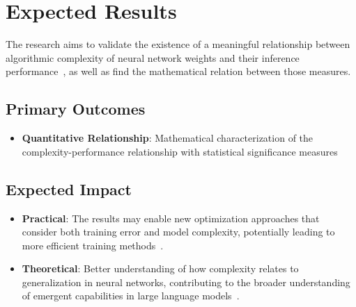 \section{Expected Results}

    The research aims to validate the existence of a meaningful relationship between algorithmic complexity of neural network weights and their inference performance~\cite{murta2025complexity}, as well as find the mathematical relation between those measures.

    \subsection{Primary Outcomes}

        \begin{itemize}
            \item \textbf{Quantitative Relationship}: Mathematical characterization of the complexity-performance relationship with statistical significance measures
        \end{itemize}

    \subsection{Expected Impact}

        \begin{itemize}
            \item \textbf{Practical}: 
            The results may enable new optimization approaches that consider both training error and model complexity, potentially leading to more efficient training methods~\cite{chollet2019measure}.

            \item \textbf{Theoretical}: 
            Better understanding of how complexity relates to generalization in neural networks, contributing to the broader understanding of emergent capabilities in large language models~\cite{wei2022emergent}.
        \end{itemize}

